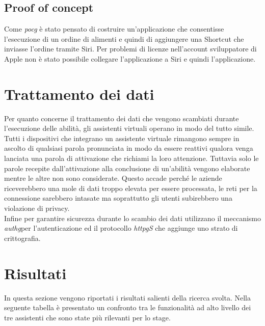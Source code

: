 	\subsection{Proof of concept}
	Come \emph{\gls{pocg}} è stato pensato di costruire un'applicazione che consentisse l'esecuzione di un ordine di alimenti e quindi di aggiungere una Shortcut che inviasse l'ordine tramite Siri. Per problemi di licenze nell'account sviluppatore di Apple non è stato possibile collegare l'applicazione a Siri e quindi l'applicazione.

\section{Trattamento dei dati}
Per quanto concerne il trattamento dei dati che vengono scambiati durante l'esecuzione delle abilità, gli assistenti virtuali operano in modo del tutto simile. \\
Tutti i dispositivi che integrano un assistente virtuale rimangono sempre in ascolto di qualsiasi parola pronunciata in modo da essere reattivi qualora venga lanciata una parola di attivazione che richiami la loro attenzione. Tuttavia solo le parole recepite dall'attivazione alla conclusione di un'abilità vengono elaborate mentre le altre non sono considerate. Questo accade perché le aziende riceverebbero una mole di dati troppo elevata per essere processata, le reti per la connessione sarebbero intasate ma soprattutto gli utenti subirebbero una violazione di privacy. \\
Infine per garantire sicurezza durante lo scambio dei dati utilizzano il meccanismo \emph{\gls{authg}}\glsfirstoccur per l'autenticazione ed il protocollo \emph{\gls{httpg}S} che aggiunge uno strato di crittografia.
\section{Risultati}
In questa sezione vengono riportati i risultati salienti della ricerca svolta. Nella seguente tabella è presentato un confronto tra le funzionalità ad alto livello dei tre assistenti che sono state più rilevanti per lo stage. \\ \\


